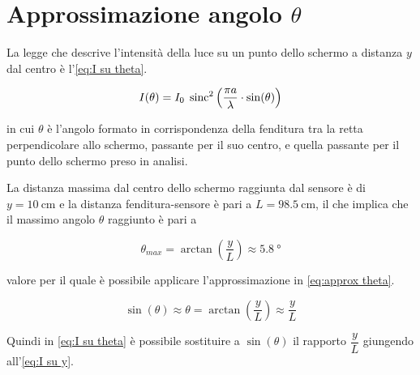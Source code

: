 \documentclass[../main.tex]{subfiles}
\begin{document}
\section{Approssimazione angolo $\theta$} \label{sec:approssimazione theta}

La legge che descrive l'intensità della luce su un punto dello schermo a distanza $y$ dal centro è l'\autoref{eq:I su theta}.

\begin{equation} \label{eq:I su theta}
    I(\theta) = I_{0} \; \operatorname{sinc}^{2} \left( \frac{\pi a}{\lambda} \cdot \sin(\theta)  \right)
\end{equation}

in cui $\theta$ è l'angolo formato in corrispondenza della fenditura tra la retta perpendicolare allo schermo, passante per il suo centro, e quella passante per il punto dello schermo preso in analisi.

La distanza massima dal centro dello schermo raggiunta dal sensore è di $y = \qty{10}{\cm}$ e la distanza fenditura-sensore è pari a $L = \qty{98.5}{\cm}$, il che implica che il massimo angolo $\theta$ raggiunto è pari a 

\begin{equation*}
    \theta_{max} = \arctan\left( \frac{y}{L} \right) \approx \qty{5.8}{\degree}
\end{equation*}

valore per il quale è possibile applicare l'approssimazione in \autoref{eq:approx theta}.

\begin{equation} \label{eq:approx theta}
    \sin(\theta) \approx \theta = \arctan\left( \frac{y}{L} \right) \approx \frac{y}{L} 
\end{equation}

Quindi in \autoref{eq:I su theta} è possibile sostituire a $\sin(\theta)$ il rapporto $\dfrac{y}{L}$ giungendo all'\autoref{eq:I su y}.
\end{document}
